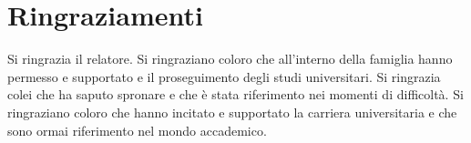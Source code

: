 \chapter*{Ringraziamenti}

\vfill

Si ringrazia il relatore.
Si ringraziano coloro che all'interno della famiglia hanno permesso e supportato e il proseguimento degli studi universitari.
Si ringrazia colei che ha saputo spronare e che è stata riferimento nei momenti di difficoltà.
Si ringraziano coloro che hanno incitato e supportato la carriera universitaria e che sono ormai riferimento nel mondo accademico.

\vfill